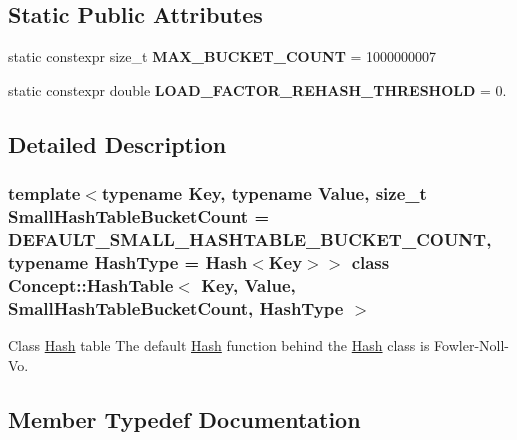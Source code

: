 \subsection*{Static Public Attributes}
\begin{DoxyCompactItemize}
\item 
\mbox{\label{class_concept_1_1_hash_table_a5cf3363e4ff4388db776b3ecb621cf53}} 
static constexpr size\+\_\+t {\bfseries M\+A\+X\+\_\+\+B\+U\+C\+K\+E\+T\+\_\+\+C\+O\+U\+NT} = 1000000007
\item 
\mbox{\label{class_concept_1_1_hash_table_ad5a277dcc48640e13cf813153aaad5bb}} 
static constexpr double {\bfseries L\+O\+A\+D\+\_\+\+F\+A\+C\+T\+O\+R\+\_\+\+R\+E\+H\+A\+S\+H\+\_\+\+T\+H\+R\+E\+S\+H\+O\+LD} = 0.
\end{DoxyCompactItemize}


\subsection{Detailed Description}
\subsubsection*{template$<$typename Key, typename Value, size\+\_\+t Small\+Hash\+Table\+Bucket\+Count = D\+E\+F\+A\+U\+L\+T\+\_\+\+S\+M\+A\+L\+L\+\_\+\+H\+A\+S\+H\+T\+A\+B\+L\+E\+\_\+\+B\+U\+C\+K\+E\+T\+\_\+\+C\+O\+U\+NT, typename Hash\+Type = Hash$<$\+Key$>$$>$\newline
class Concept\+::\+Hash\+Table$<$ Key, Value, Small\+Hash\+Table\+Bucket\+Count, Hash\+Type $>$}

Class \mbox{\hyperlink{class_concept_1_1_hash}{Hash}} table The default \mbox{\hyperlink{class_concept_1_1_hash}{Hash}} function behind the \mbox{\hyperlink{class_concept_1_1_hash}{Hash}} class is Fowler-\/\+Noll-\/\+Vo. 

\subsection{Member Typedef Documentation}
\mbox{\label{class_concept_1_1_hash_table_a567c99ad671a5065563483689abdf399}} 
